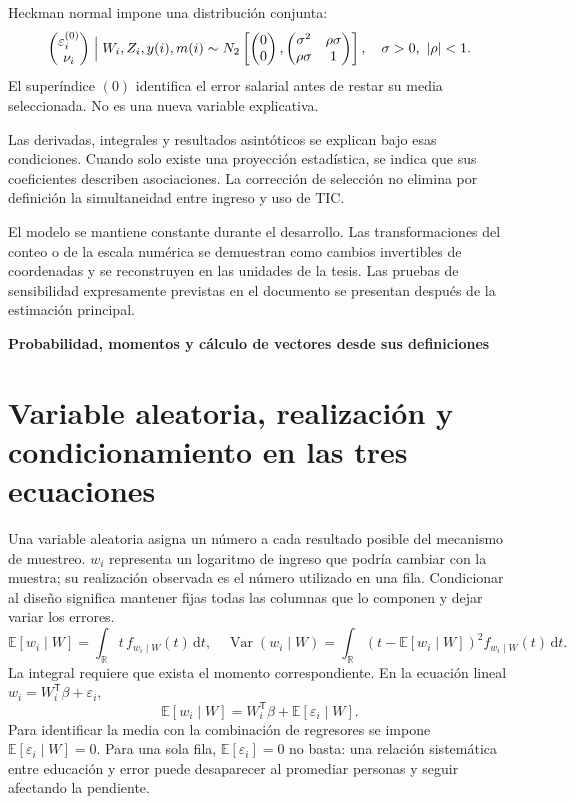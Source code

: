 \documentclass[11pt,a4paper]{article}
\newcommand{\E}{\mathbb E}
\DeclareMathOperator{\Var}{Var}
\begin{document}
Heckman normal impone una distribución conjunta:
\[
\begin{pmatrix}\varepsilon_i^{(0)}\\\nu_i\end{pmatrix}
\Bigm|W_i,Z_i,y(i),m(i)
\sim N_2\left[
\begin{pmatrix}0\\0\end{pmatrix},
\begin{pmatrix}\sigma^2&\rho\sigma\\\rho\sigma&1\end{pmatrix}\right],
\quad \sigma>0,\ |\rho|<1.
\]
El superíndice $(0)$ identifica el error salarial antes de restar su media seleccionada. No es una nueva variable explicativa.

Las derivadas, integrales y resultados asintóticos se explican bajo esas condiciones. Cuando solo existe una proyección estadística, se indica que sus coeficientes describen asociaciones. La corrección de selección no elimina por definición la simultaneidad entre ingreso y uso de TIC.

El modelo se mantiene constante durante el desarrollo. Las transformaciones del conteo o de la escala numérica se demuestran como cambios invertibles de coordenadas y se reconstruyen en las unidades de la tesis. Las pruebas de sensibilidad expresamente previstas en el documento se presentan después de la estimación principal.

\clearpage
{}
{\large\bfseries\color{azul}Probabilidad, momentos y cálculo de vectores desde sus definiciones}\par\vspace{2mm}
\section{Variable aleatoria, realización y condicionamiento en las tres ecuaciones}

Una variable aleatoria asigna un número a cada resultado posible del mecanismo de muestreo. $w_i$ representa un logaritmo de ingreso que podría cambiar con la muestra; su realización observada es el número utilizado en una fila. Condicionar al diseño significa mantener fijas todas las columnas que lo componen y dejar variar los errores.
\[
\E[w_i\mid W]=\int_{\mathbb R}t\,f_{w_i\mid W}(t)\,\mathrm dt,
\quad
\Var(w_i\mid W)=\int_{\mathbb R}
(t-\E[w_i\mid W])^2f_{w_i\mid W}(t)\,\mathrm dt.
\]
La integral requiere que exista el momento correspondiente. En la ecuación lineal $w_i=W_i^{\mathsf T}\beta+\varepsilon_i$,
\[
\E[w_i\mid W]=W_i^{\mathsf T}\beta+\E[\varepsilon_i\mid W].
\]
Para identificar la media con la combinación de regresores se impone $\E[\varepsilon_i\mid W]=0$. Para una sola fila, $\E[\varepsilon_i]=0$ no basta: una relación sistemática entre educación y error puede desaparecer al promediar personas y seguir afectando la pendiente.
\end{document}
